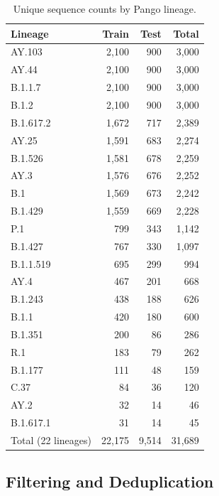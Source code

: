 \documentclass[conference]{IEEEtran}
\begin{document}
\begin{table}[!t]
    \centering
    \caption{Unique sequence counts by Pango lineage.}
    \label{tab:lineage-frequency}
    \small
    \setlength{\tabcolsep}{0pt}
    \renewcommand{\arraystretch}{1.15}
    \begin{tabular*}{\columnwidth}{@{\extracolsep{\fill}}lrrr@{}}
        \toprule
        Lineage & Train & Test & Total \\
        \midrule
        AY.103    & 2,100 & 900 & 3,000 \\
        AY.44     & 2,100 & 900 & 3,000 \\
        B.1.1.7   & 2,100 & 900 & 3,000 \\
        B.1.2     & 2,100 & 900 & 3,000 \\
        B.1.617.2 & 1,672 & 717 & 2,389 \\
        AY.25     & 1,591 & 683 & 2,274 \\
        B.1.526   & 1,581 & 678 & 2,259 \\
        AY.3      & 1,576 & 676 & 2,252 \\
        B.1       & 1,569 & 673 & 2,242 \\
        B.1.429   & 1,559 & 669 & 2,228 \\
        P.1       & 799 & 343 & 1,142 \\
        B.1.427   & 767 & 330 & 1,097 \\
        B.1.1.519 & 695 & 299 & 994 \\
        AY.4      & 467 & 201 & 668 \\
        B.1.243   & 438 & 188 & 626 \\
        B.1.1     & 420 & 180 & 600 \\
        B.1.351   & 200 & 86 & 286 \\
        R.1       & 183 & 79 & 262 \\
        B.1.177   & 111 & 48 & 159 \\
        C.37      & 84 & 36 & 120 \\
        AY.2      & 32 & 14 & 46 \\
        B.1.617.1 & 31 & 14 & 45 \\
        \midrule
        Total (22 lineages) & 22,175 & 9,514 & 31,689 \\
        \bottomrule
    \end{tabular*}
\end{table}

\subsection{Filtering and Deduplication}
\end{document}
